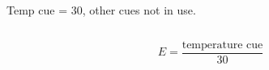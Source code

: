 \documentclass[pdf]{beamer}
\begin{document}
\begin{frame}
\begin{columns}


\begin{small}
Temp cue = 30, other cues not in use.
\end{small}
\end{columns}

\begin{tiny}
\[E=\frac{\text{temperature cue}}{30}\]
\end{tiny}
\end{frame}
%
\end{document}

